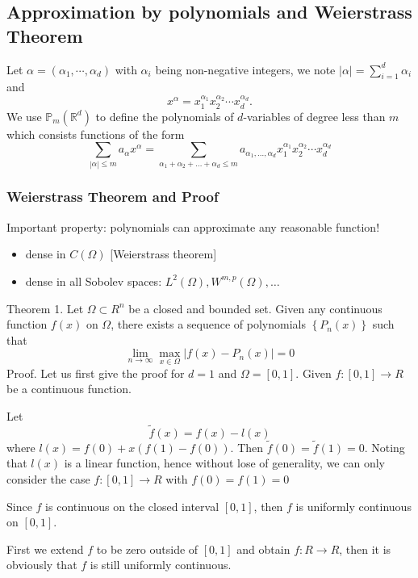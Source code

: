 \documentclass[10pt]{article}
\begin{document}
\subsection{Approximation by polynomials and Weierstrass Theorem}
Let $\alpha=\left(\alpha_{1}, \cdots, \alpha_{d}\right)$ with $\alpha_{i}$ being non-negative integers, we note $|\alpha|=\sum_{i=1}^{d} \alpha_{i}$ and
$$
x^{\alpha}=x_{1}^{\alpha_{1}} x_{2}^{\alpha_{2}} \cdots x_{d}^{\alpha_{d}} .
$$
We use $\mathbb{P}_{m}\left(\mathbb{R}^{d}\right)$ to define the polynomials of $d$-variables of degree less than $m$ which consists functions of the form
$$
\sum_{|\alpha| \leq m} a_{\alpha} x^{\alpha}=\sum_{\alpha_{1}+\alpha_{2}+\ldots+\alpha_{d} \leq m} a_{\alpha_{1}, \ldots, \alpha_{d}} x_{1}^{\alpha_{1}} x_{2}^{\alpha_{2}} \cdots x_{d}^{\alpha_{d}}
$$

\subsubsection{Weierstrass Theorem and Proof}
Important property: polynomials can approximate any reasonable function!

  \begin{itemize}
    \item dense in $C(\Omega)$ [Weierstrass theorem]

    \item dense in all Sobolev spaces: $L^{2}(\Omega), W^{m, p}(\Omega), \ldots$

  \end{itemize}
Theorem 1. Let $\Omega \subset R^{n}$ be a closed and bounded set. Given any continuous function $f(x)$ on $\Omega$, there exists a sequence of polynomials $\left\{P_{n}(x)\right\}$ such that
$$
\lim _{n \rightarrow \infty} \max _{x \in \Omega}\left|f(x)-P_{n}(x)\right|=0
$$
Proof. Let us first give the proof for $d=1$ and $\Omega=[0,1] .$ Given $f:[0,1] \rightarrow R$ be a continuous function.

Let
$$
\tilde{f}(x)=f(x)-l(x)
$$
where $l(x)=f(0)+x(f(1)-f(0))$. Then $\tilde{f}(0)=\tilde{f}(1)=0$. Noting that $l(x)$ is a linear function, hence without lose of generality, we can only consider the case $f:[0,1] \rightarrow R$ with $f(0)=f(1)=0$

Since $f$ is continuous on the closed interval $[0,1]$, then $f$ is uniformly continuous on $[0,1]$.

First we extend $f$ to be zero outside of $[0,1]$ and obtain $f: R \rightarrow R$, then it is obviously that $f$ is still uniformly continuous.
\end{document}
